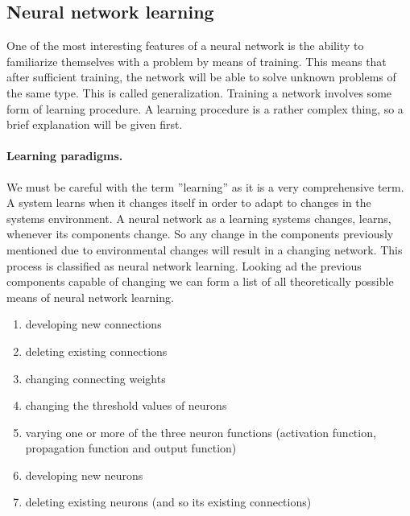 \documentclass[pdftex,a4paper,12pt,twoside]{report}
\theoremstyle{plain} \newtheorem{theorem}{Theorem} \newtheorem{proposition}{Proposition} \newtheorem{lemma}{Lemma} \newtheorem*{corollary}{Corollary}
\theoremstyle{definition} \newtheorem{definition}{Definition} \newtheorem{conjecture}{Conjecture} \newtheorem*{example}{Example} \newtheorem{algorithm}{Algorithm}
\theoremstyle{remark} \newtheorem*{remark}{Remark} \newtheorem*{note}{Note} \newtheorem{case}{Case}
\begin{document}
\subsection{Neural network learning}
One of the most interesting features of a neural network is the ability to familiarize themselves with a problem by means of training. This means that after sufficient training, the network will be able to solve unknown problems of the same type. This is called generalization. Training a  network involves some form of learning procedure. A learning procedure is a rather complex thing, so a brief explanation will be given first.
\paragraph{Learning paradigms.}
We must be careful with the term ''learning'' as it is a very comprehensive term. A system learns when it changes itself in order to adapt to changes in the systems environment. A neural network as a learning systems changes, learns, whenever its components change. So any change in the components previously  mentioned due to environmental changes will result in a changing network. This process is classified as neural network learning. Looking ad the previous components capable of changing we can form a list of all theoretically possible means of neural network learning.
\begin{enumerate}
\item developing new connections
\item deleting existing connections
\item changing connecting weights
\item changing the threshold values of neurons
\item varying one or more of the three neuron functions (activation function, propagation function and output function)
\item developing new neurons
\item deleting existing neurons (and so its existing connections)
\end{enumerate}
\end{document}
